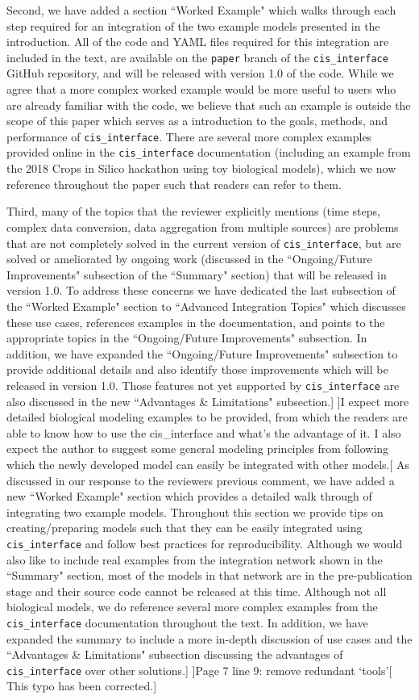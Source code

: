 \documentclass[11pt]{article}
\newcommand{\pkg}{{\tt cis\_interface}{}}
\newcommand{\cmark}{\ding{51}}%
\newcommand{\done}{\makebox[0pt][l]{$\square$}{\raisebox{2pt}{\large\hspace{1pt}\cmark}}%
\hspace{-2.5pt}}
\begin{document}
\begin{comments}
Second, we have added a section ``Worked Example" which walks through each step required for an integration of the two example models presented in the introduction. All of the code and YAML files required for this integration are included in the text, are available on the {\tt paper} branch of the {\pkg} GitHub repository, and will be released with version 1.0 of the code. While we agree that a more complex worked example would be more useful to users who are already familiar with the code, we believe that such an example is outside the scope of this paper which serves as a introduction to the goals, methods, and performance of {\pkg}. There are several more complex examples provided online in the {\pkg} documentation (including an example from the 2018 Crops in Silico hackathon using toy biological models), which we now reference throughout the paper such that readers can refer to them.

Third, many of the topics that the reviewer explicitly mentions (time steps, complex data conversion, data aggregation from multiple sources) are problems that are not completely solved in the current version of {\pkg}, but are solved or ameliorated by ongoing work (discussed in the ``Ongoing/Future Improvements" subsection of the ``Summary" section) that will be released in version 1.0. To address these concerns we have dedicated the last subsection of the ``Worked Example" section to ``Advanced Integration Topics" which discusses these use cases, references examples in the documentation, and points to the appropriate topics in the ``Ongoing/Future Improvements" subsection. In addition, we have expanded the ``Ongoing/Future Improvements" subsection to provide additional details and also identify those improvements which will be released in version 1.0. Those features not yet supported by {\pkg} are also discussed in the new ``Advantages \& Limitations" subsection.]
\comment[\done]{I expect more detailed biological modeling examples to be provided, from which the readers are able to know how to use the cis{\_}interface and what's the advantage of it. I also expect the author to suggest some general modeling principles from following which the newly developed model can easily be integrated with other models.}[%
%
As discussed in our response to the reviewers previous comment, we have added a new ``Worked Example" section which provides a detailed walk through of integrating two example models. Throughout this section we provide tips on creating/preparing models such that they can be easily integrated using {\pkg} and follow best practices for reproducibility. Although we would also like to include real examples from the integration network shown in the ``Summary" section, most of the models in that network are in the pre-publication stage and their source code cannot be released at this time. Although not all biological models, we do reference several more complex examples from the {\pkg} documentation throughout the text. In addition, we have expanded the summary to include a more in-depth discussion of use cases and the ``Advantages \& Limitations" subsection discussing the advantages of {\pkg} over other solutions.]
\comment[\done]{Page 7 line 9: remove redundant `tools'}[
%
This typo has been corrected.]
\end{comments}
\end{document}

